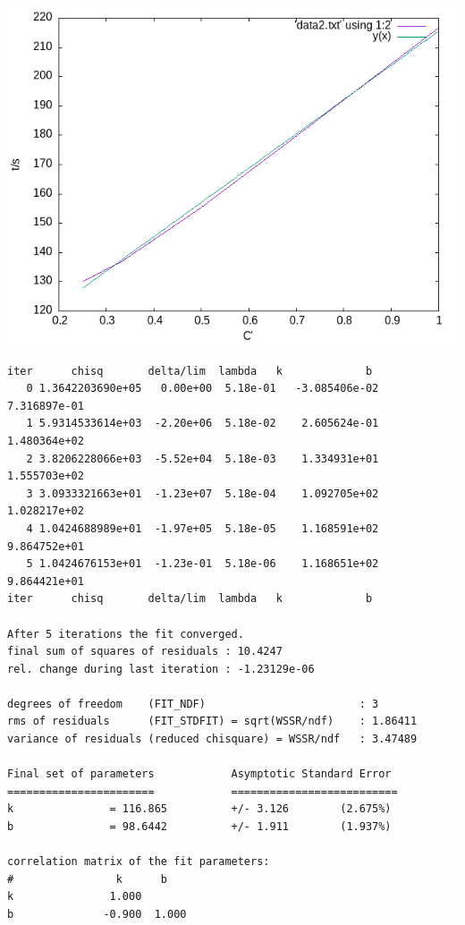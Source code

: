 \documentclass[11pt]{report}
\begin{document}
\begin{center}
\includegraphics[width=.9\linewidth]{../data/out2.png}
\end{center}
\begin{verbatim}
iter      chisq       delta/lim  lambda   k             b            
   0 1.3642203690e+05   0.00e+00  5.18e-01   -3.085406e-02   7.316897e-01
   1 5.9314533614e+03  -2.20e+06  5.18e-02    2.605624e-01   1.480364e+02
   2 3.8206228066e+03  -5.52e+04  5.18e-03    1.334931e+01   1.555703e+02
   3 3.0933321663e+01  -1.23e+07  5.18e-04    1.092705e+02   1.028217e+02
   4 1.0424688989e+01  -1.97e+05  5.18e-05    1.168591e+02   9.864752e+01
   5 1.0424676153e+01  -1.23e-01  5.18e-06    1.168651e+02   9.864421e+01
iter      chisq       delta/lim  lambda   k             b            

After 5 iterations the fit converged.
final sum of squares of residuals : 10.4247
rel. change during last iteration : -1.23129e-06

degrees of freedom    (FIT_NDF)                        : 3
rms of residuals      (FIT_STDFIT) = sqrt(WSSR/ndf)    : 1.86411
variance of residuals (reduced chisquare) = WSSR/ndf   : 3.47489

Final set of parameters            Asymptotic Standard Error
=======================            ==========================
k               = 116.865          +/- 3.126        (2.675%)
b               = 98.6442          +/- 1.911        (1.937%)

correlation matrix of the fit parameters:
#                k      b      
k               1.000 
b              -0.900  1.000 

\end{verbatim}
\end{document}
